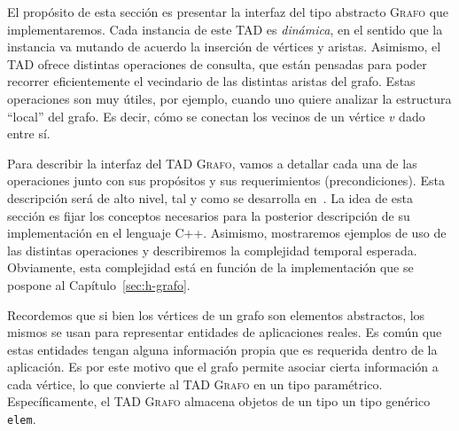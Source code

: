 \documentclass[%
    a4paper,%
    fontsize=12pt,%
    DIV=12,
    twoside,%
    openright,%
    titlepage=true,%
    headsepline,%
    toc=bibliography,%
    parskip=half,%
    cleardoublepage=empty,%
    headings=big,%
]{scrbook}
\makeatletter
\newcommand{\Grafo}{\textsc{Grafo}\xspace}
\newcommand{\Code}[2][]{\lstinline[basicstyle={\ttfamily},#1]@#2@}
\DeclareRobustCommand{\CPP}{C\nolinebreak[4]\hspace{-.05em}\raisebox{.4ex}{\relsize{-3}\textbf{++}}\xspace}
\def\CPP{C++}%
\makeatother
\begin{document}
\def\lstlistingname{Pseudocódigo}
 
El propósito de esta sección es presentar la interfaz del tipo abstracto \Grafo que implementaremos.  Cada instancia de este TAD es \emph{dinámica}, en el sentido que la instancia va mutando de acuerdo la inserción de vértices y aristas.  Asimismo, el TAD ofrece distintas operaciones de consulta, que están pensadas para poder recorrer eficientemente el vecindario de las distintas aristas del grafo.  Estas operaciones son muy útiles, por ejemplo, cuando uno quiere analizar la estructura ``local'' del grafo.  Es decir, cómo se conectan los vecinos de un vértice $v$ dado entre sí.  

Para describir la interfaz del TAD \Grafo, vamos a detallar cada una de las operaciones junto con sus propósitos y sus requerimientos (precondiciones).  Esta descripción será de alto nivel, tal y como se desarrolla en~\cite{LinSoulignacSzwarcfiterTCS2012}.  La idea de esta sección es fijar los conceptos necesarios para la posterior descripción de su implementación en el lenguaje \CPP.  Asimismo, mostraremos ejemplos  de uso de las distintas operaciones y describiremos la complejidad temporal esperada.  Obviamente, esta complejidad está en función de la implementación que se pospone al Capítulo~\ref{sec:h-grafo}.  

Recordemos que si bien los vértices de un grafo son elementos abstractos, los mismos se usan para representar entidades de aplicaciones reales.  Es común que estas entidades tengan alguna información propia que es requerida dentro de la aplicación.  Es por este motivo que el grafo permite asociar cierta información a cada vértice, lo que convierte al TAD \Grafo en un tipo paramétrico.  Específicamente, el TAD \Grafo almacena objetos de un tipo un tipo genérico \Code{elem}.
\end{document}
